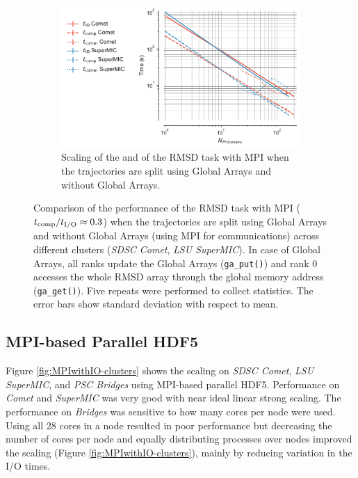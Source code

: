 \begin{figure}[ht!]
\begin{subfigure} {.8\textwidth}
  \includegraphics[width=\linewidth]{figures/Clusters_IO_compute_scaling_splitting.pdf}
  \captionsetup{format=hang}
  \caption{Scaling of the \tcomp and \tIO of the RMSD task with MPI when the trajectories are split using Global Arrays and without Global Arrays.}
  \label{fig:compute-IO-scaling-clusters-splitting}
\end{subfigure}
%
\caption{Comparison of the performance of the RMSD task with MPI (${t}_{\text{comp}}/{t}_{\text{I/O}} \approx 0.3$) when the trajectories are split using Global Arrays and without Global Arrays (using MPI for communications) across different clusters (\emph{SDSC Comet}, \emph{LSU SuperMIC}). 
In case of Global Arrays, all ranks update the Global Arrays (\texttt{ga\_put()}) and rank 0 accesses the whole RMSD array through the global memory address (\texttt{ga\_get()}).
Five repeats were performed to collect statistics. The error bars show standard deviation with respect to mean.}
\label{fig:MPI-splitting-clusters}
\end{figure} 

\subsection{MPI-based Parallel HDF5}
Figure \ref{fig:MPIwithIO-clusters} shows the scaling on \emph{SDSC Comet}, \emph{LSU SuperMIC}, and \emph{PSC Bridges} using MPI-based parallel HDF5.  
Performance on \emph{Comet} and \emph{SuperMIC} was very good with near ideal linear strong scaling.
The performance on \emph{Bridges} was sensitive to how many cores per node were used.
Using all 28 cores in a node resulted in poor performance but decreasing the number of cores per node and  equally distributing processes over nodes improved the scaling (Figure \ref{fig:MPIwithIO-clusters}), mainly by reducing variation in the I/O times.

